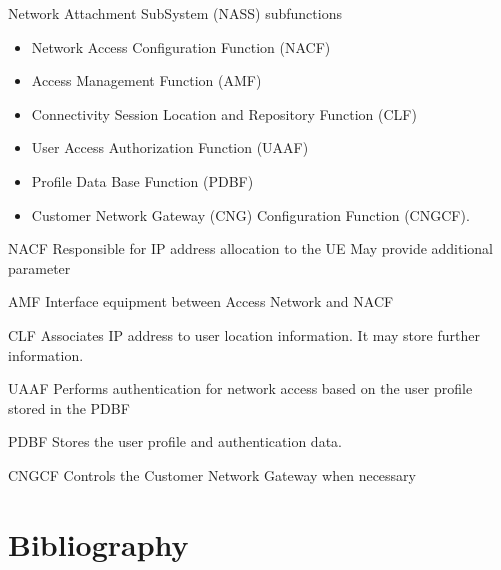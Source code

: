 \documentclass[pdf]{beamer}
\begin{document}
    \begin{frame}
     \begin{block}{Network Attachment SubSystem (NASS) subfunctions}       
            \begin{itemize}
                \item<+-> Network Access Configuration Function (NACF)
                \item<+-> Access Management Function (AMF)
                \item<+-> Connectivity Session Location and Repository Function (CLF)
                \item<+-> User Access Authorization Function (UAAF)
                \item<+-> Profile Data Base Function (PDBF)
                \item<+-> Customer Network Gateway (CNG) Configuration Function (CNGCF).
            \end{itemize}
     \end{block}
     
     \begin{overprint}
             \begin{block}{NACF}
                    Responsible for IP address allocation to the UE           
                    May provide additional parameter
                \end{block}
             \begin{block}{AMF}
                Interface equipment between Access Network and NACF
                \end{block}             
             \begin{block}{CLF}
                Associates IP address to user location information. It may store further information.
                \end{block}     
             \begin{block}{UAAF}
                Performs authentication for network access based on the user profile stored in the PDBF
                \end{block}     
             \begin{block}{PDBF}
             Stores the user profile and authentication data.   
                \end{block}     
             \begin{block}{CNGCF}
                Controls the Customer Network Gateway when necessary
                \end{block}                                                                                     
     \end{overprint}
    \end{frame}     


\section*{Bibliography}
    
\end{document}
